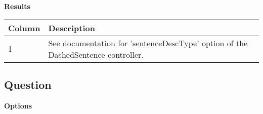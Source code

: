 \documentclass[
]{article}
\begin{document}
\textbf{Results}

\begin{RaggedRight}\small\begin{longtable}[]{p{1.7in}p{4.3in}}
\toprule
\begin{minipage}[b]{0.39\columnwidth}\raggedright
\textbf{Column}\strut
\end{minipage} & \begin{minipage}[b]{0.55\columnwidth}\raggedright
\textbf{Description}\strut
\end{minipage}\tabularnewline
\midrule
\endhead
\begin{minipage}[t]{0.39\columnwidth}\raggedright
1\strut
\end{minipage} & \begin{minipage}[t]{0.55\columnwidth}\raggedright
See documentation for 'sentenceDescType' option of the DashedSentence
controller.\strut
\end{minipage}\tabularnewline
\bottomrule
\end{longtable}\normalsize\end{RaggedRight}

\hypertarget{question}{%
\subsection{Question}\label{question}}

\textbf{Options}
\end{document}

